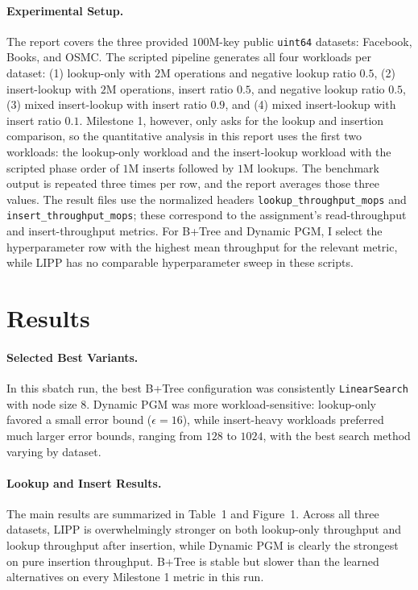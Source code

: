 \documentclass[10pt]{article}
\begin{document}
\paragraph{Experimental Setup.}
The report covers the three provided \(100\)M-key public \texttt{uint64} datasets: Facebook, Books, and OSMC. The scripted pipeline generates all four workloads per dataset: (1) lookup-only with \(2\)M operations and negative lookup ratio \(0.5\), (2) insert-lookup with \(2\)M operations, insert ratio \(0.5\), and negative lookup ratio \(0.5\), (3) mixed insert-lookup with insert ratio \(0.9\), and (4) mixed insert-lookup with insert ratio \(0.1\). Milestone 1, however, only asks for the lookup and insertion comparison, so the quantitative analysis in this report uses the first two workloads: the lookup-only workload and the insert-lookup workload with the scripted phase order of \(1\)M inserts followed by \(1\)M lookups. The benchmark output is repeated three times per row, and the report averages those three values. The result files use the normalized headers \texttt{lookup\_throughput\_mops} and \texttt{insert\_throughput\_mops}; these correspond to the assignment's read-throughput and insert-throughput metrics. For B+Tree and Dynamic PGM, I select the hyperparameter row with the highest mean throughput for the relevant metric, while LIPP has no comparable hyperparameter sweep in these scripts.

\section*{Results}

\paragraph{Selected Best Variants.}
In this sbatch run, the best B+Tree configuration was consistently \texttt{LinearSearch} with node size \(8\). Dynamic PGM was more workload-sensitive: lookup-only favored a small error bound (\(\epsilon=16\)), while insert-heavy workloads preferred much larger error bounds, ranging from \(128\) to \(1024\), with the best search method varying by dataset.

\paragraph{Lookup and Insert Results.}
The main results are summarized in Table~1 and Figure~1. Across all three datasets, LIPP is overwhelmingly stronger on both lookup-only throughput and lookup throughput after insertion, while Dynamic PGM is clearly the strongest on pure insertion throughput. B+Tree is stable but slower than the learned alternatives on every Milestone 1 metric in this run.
\end{document}
